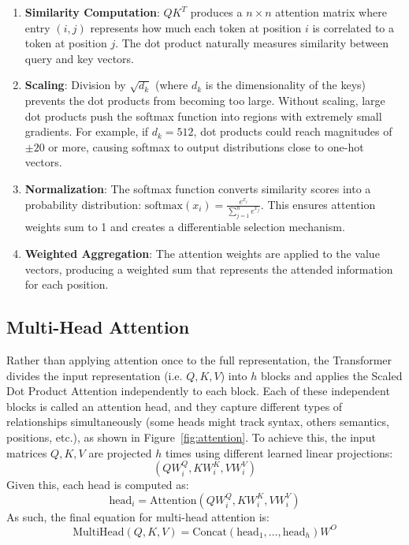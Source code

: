 \begin{enumerate}
   \item \textbf{Similarity Computation}: $QK^T$ produces a $n \times n$ attention matrix where entry $(i,j)$ represents how much each token at position $i$ is correlated to a token at position $j$. The dot product naturally measures similarity between query and key vectors.

   \item \textbf{Scaling}: Division by $\sqrt{d_k}$ (where $d_k$ is the dimensionality of the keys) prevents the dot products from becoming too large. Without scaling, large dot products push the softmax function into regions with extremely small gradients. For example, if $d_k = 512$, dot products could reach magnitudes of $\pm 20$ or more, causing softmax to output distributions close to one-hot vectors.

   \item \textbf{Normalization}: The softmax function converts similarity scores into a probability distribution: $\text{softmax}(x_i) = \frac{e^{x_i}}{\sum_{j=1}^n e^{x_j}}$. This ensures attention weights sum to 1 and creates a differentiable selection mechanism.

   \item \textbf{Weighted Aggregation}: The attention weights are applied to the value vectors, producing a weighted sum that represents the attended information for each position.
\end{enumerate}

\subsection{Multi-Head Attention}

Rather than applying attention once to the full representation, the Transformer divides the input representation (i.e. $Q, K, V$) into $h$ blocks and applies the Scaled Dot Product Attention independently to each block. Each of these independent blocks is called an attention head, and they capture different types of relationships simultaneously (some heads might track syntax, others semantics, positions, etc.), as shown in Figure~\ref{fig:attention}. To achieve this, the input matrices $Q, K, V$ are projected $h$ times using different learned linear projections:
\begin{equation}
(QW_i^Q, KW_i^K, VW_i^V)
\end{equation}
Given this, each head is computed as:
\begin{equation}
\text{head}_i = \text{Attention}(QW_i^Q, KW_i^K, VW_i^V)
\end{equation}
As such, the final equation for multi-head attention is:
\begin{equation}
\text{MultiHead}(Q, K, V) = \text{Concat}(\text{head}_1, \ldots, \text{head}_h)W^O
\end{equation}

